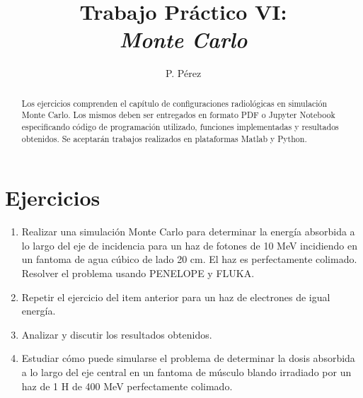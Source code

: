 \documentclass[a4paper,10pt]{article}
\title{{\bf Trabajo Práctico VI:}\\ \emph{Monte Carlo}}
\author{P. Pérez}
\begin{document}
\maketitle

\begin{abstract}
Los ejercicios comprenden el capítulo de configuraciones radiológicas en simulación Monte Carlo. Los mismos deben ser entregados en formato PDF  o Jupyter Notebook especificando código de programación utilizado, funciones implementadas y resultados obtenidos. Se aceptarán trabajos realizados en plataformas Matlab y Python.
\end{abstract}

\section*{Ejercicios}

\begin{enumerate}
 \item  Realizar una simulación Monte Carlo para determinar la energía absorbida a lo largo del eje de incidencia para un haz de fotones de 10 MeV incidiendo en un fantoma de agua cúbico de lado 20 cm. El haz es perfectamente colimado. Resolver el problema usando PENELOPE y FLUKA.
 \item Repetir el ejercicio del item anterior para un haz de electrones de igual energía.
 \item Analizar y discutir los resultados obtenidos.
 \item Estudiar cómo puede simularse el problema de determinar la dosis absorbida a lo largo del eje central en un fantoma de músculo blando irradiado por un haz de 1 H de 400 MeV perfectamente colimado.
\end{enumerate}
\end{document}
